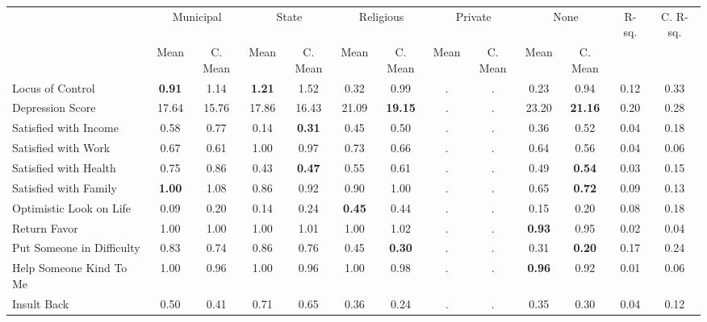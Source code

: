 \begin{tabular}{l c c c c c c c c c c c c}
\toprule
& \multicolumn{2}{c}{Municipal} & \multicolumn{2}{c}{State} & \multicolumn{2}{c}{Religious} & \multicolumn{2}{c}{Private} & \multicolumn{2}{c}{None} & R-sq. & C. R-sq. \\
& \scriptsize Mean & \scriptsize C. Mean & \scriptsize Mean & \scriptsize C. Mean & \scriptsize Mean & \scriptsize C. Mean & \scriptsize Mean & \scriptsize C. Mean & \scriptsize Mean & \scriptsize C. Mean & & \\
\midrule
Locus of Control & \textbf{     0.91} & 1.14 & \textbf{     1.21} & 1.52 &      0.32 & 0.99 &         . & . &      0.23 & 0.94 &      0.12 &      0.33 \\
Depression Score &     17.64 & 15.76 &     17.86 & 16.43 &     21.09 & \textbf{    19.15} &         . & . &     23.20 & \textbf{    21.16} &      0.20 &      0.28 \\
Satisfied with Income &      0.58 & 0.77 &      0.14 & \textbf{     0.31} &      0.45 & 0.50 &         . & . &      0.36 & 0.52 &      0.04 &      0.18 \\
Satisfied with Work &      0.67 & 0.61 &      1.00 & 0.97 &      0.73 & 0.66 &         . & . &      0.64 & 0.56 &      0.04 &      0.06 \\
Satisfied with Health &      0.75 & 0.86 &      0.43 & \textbf{     0.47} &      0.55 & 0.61 &         . & . &      0.49 & \textbf{     0.54} &      0.03 &      0.15 \\
Satisfied with Family & \textbf{     1.00} & 1.08 &      0.86 & 0.92 &      0.90 & 1.00 &         . & . &      0.65 & \textbf{     0.72} &      0.09 &      0.13 \\
Optimistic Look on Life &      0.09 & 0.20 &      0.14 & 0.24 & \textbf{     0.45} & 0.44 &         . & . &      0.15 & 0.20 &      0.08 &      0.18 \\
Return Favor &      1.00 & 1.00 &      1.00 & 1.01 &      1.00 & 1.02 &         . & . & \textbf{     0.93} & 0.95 &      0.02 &      0.04 \\
Put Someone in Difficulty &      0.83 & 0.74 &      0.86 & 0.76 &      0.45 & \textbf{     0.30} &         . & . &      0.31 & \textbf{     0.20} &      0.17 &      0.24 \\
Help Someone Kind To Me &      1.00 & 0.96 &      1.00 & 0.96 &      1.00 & 0.98 &         . & . & \textbf{     0.96} & 0.92 &      0.01 &      0.06 \\
Insult Back &      0.50 & 0.41 &      0.71 & 0.65 &      0.36 & 0.24 &         . & . &      0.35 & 0.30 &      0.04 &      0.12 \\
\bottomrule
\end{tabular}
